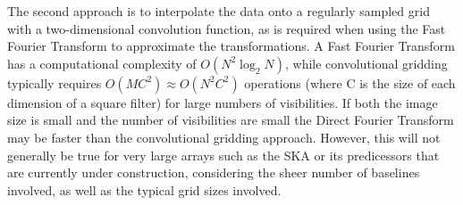  The second approach is to interpolate the data onto a regularly sampled grid with a two-dimensional convolution function, as is required when using the Fast Fourier Transform to approximate the transformations. A Fast Fourier Transform has a computational complexity of $O(N^2\log_2{N})$, while
 convolutional gridding typically requires $O(MC^2) \approx O(N^2C^2)$ operations (where C is the size of each dimension of a square filter) for large numbers of visibilities. If both the image size is small and the number of visibilities 
 are small the Direct Fourier Transform may be faster than the convolutional gridding approach. However, this will not generally be true for very large arrays such as the SKA or its predicessors that are currently under construction, 
 considering the sheer number of baselines involved, as well as the typical grid sizes involved.
 
